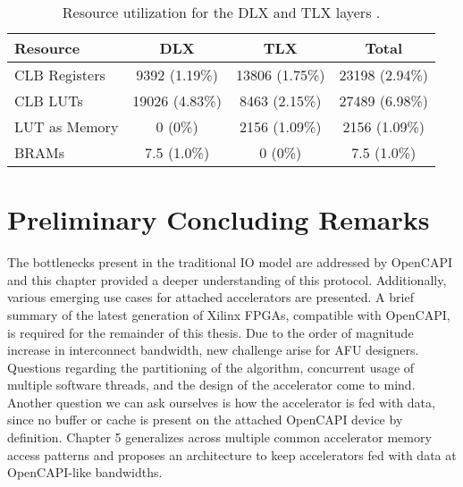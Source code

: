\begin{table}[H]
  \centering
  \caption{Resource utilization for the DLX and TLX layers \cite{opencapi-enablement}.}
  \label{tab:9v3}
  \begin{tabular}{ l | c | c | c }
    \textbf{Resource}   & \textbf{DLX}  & \textbf{TLX}  & \textbf{Total} \\ \hline
    CLB Registers       & 9392 (1.19\%) & 13806 (1.75\%)    & 23198 (2.94\%) \\
    CLB LUTs            & 19026 (4.83\%) & 8463 (2.15\%)    & 27489 (6.98\%) \\
    LUT as Memory       & 0 (0\%) & 2156 (1.09\%)           & 2156 (1.09\%) \\
    BRAMs               & 7.5 (1.0\%) & 0 (0\%)             & 7.5 (1.0\%) \\
  \end{tabular}
\end{table}


\section{Preliminary Concluding Remarks}
The bottlenecks present in the traditional IO model are addressed by OpenCAPI and this chapter provided a deeper understanding of this protocol. Additionally, various emerging use cases for attached accelerators are presented. A brief summary of the latest generation of Xilinx FPGAs, compatible with OpenCAPI, is required for the remainder of this thesis. Due to the order of magnitude increase in interconnect bandwidth, new challenge arise for AFU designers. Questions regarding the partitioning of the algorithm, concurrent usage of multiple software threads, and the design of the accelerator come to mind.\\
Another question we can ask ourselves is how the accelerator is fed with data, since no buffer or cache is present on the attached OpenCAPI device by definition. Chapter 5 generalizes across multiple common accelerator memory access patterns and proposes an architecture to keep accelerators fed with data at OpenCAPI-like bandwidths.
